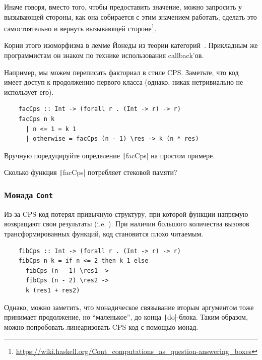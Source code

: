 Иначе говоря, вместо того, чтобы предоставить значение, можно запросить у вызывающей стороны, как она собирается с этим значением работать, сделать это самостоятельно и вернуть вызывающей стороне\footnote{\url{https://wiki.haskell.org/Cont_computations_as_question-answering_boxes}}.


Корни этого изоморфизма в лемме Йонеды из теории категорий~\cite{hinze2010reason}.
Прикладным же программистам он знаком по технике использования callback'ов.

Например, мы можем переписать факториал в стиле CPS.
Заметьте, что код имеет доступ к продолжению первого класса (однако, никак нетривиально не использует его).
\begin{verbatim}
    facCps :: Int -> (forall r . (Int -> r) -> r)
    facCps n k
      | n <= 1 = k 1
      | otherwise = facCps (n - 1) \res -> k (n * res)
\end{verbatim}

\begin{task}
    Вручную поредуцируйте определение \texttt|facCps| на простом примере.
\end{task}

\begin{task}
    Сколько функция \texttt|facCps| потребляет стековой памяти?
\end{task}

\subsubsection{Монада \texttt{Cont}}

Из-за CPS код потерял привычную структуру, при которой функции напрямую возвращают свои результаты (i.e. ).
При наличии большого количества вызовов трансформированных функций, код становится плохо читаемым.

\begin{verbatim}
    fibCps :: Int -> (forall r . (Int -> r) -> r)
    fibCps n k = if n <= 2 then k 1 else
      fibCps (n - 1) \res1 ->
      fibCps (n - 2) \res2 ->
      k (res1 + res2)
\end{verbatim}

Однако, можно заметить, что монадическое связывание вторым аргументом тоже принимает продолжение, но ``маленькое'', до конца \texttt|do|-блока.
Таким образом, можно попробовать линеаризовать CPS код с помощью монад.

